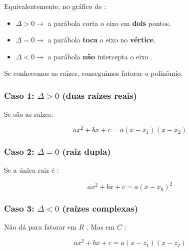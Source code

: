 \documentclass[../resumo.tex]{subfiles}
\begin{document}
	Equivalentemente, no gráfico de :
	
	\begin{itemize}
		\item $\Delta > 0 \rightarrow$ a parábola corta o eixo em \textbf{dois} pontos.
		\item $\Delta = 0 \rightarrow$ a parábola \textbf{toca} o eixo no \textbf{vértice}.
		\item $\Delta < 0 \rightarrow$ a parábola \textbf{não} intercepta o eixo .
	\end{itemize}

	Se conhecemos as raízes, conseguimos fatorar o polinômio.

	\subsubsection{Caso 1: $\Delta > 0$ (duas raízes reais)}

	Se  são as raízes:

	\[ ax^2 + bx + c = a(x - x_1)(x - x_2) \]

	\subsubsection{Caso 2: $\Delta = 0$ (raiz dupla)}

	Se a única raiz é :

	\[ ax^2 + bx + c = a(x - x_0)^2 \]

	\subsubsection{Caso 3: $\Delta < 0$ (raízes complexas)}

	Não dá para fatorar em $R$ . Mas em $C$ :

	\[ ax^2 + bx + c = a(x - z_1)(x - z_2) \]
\end{document}

